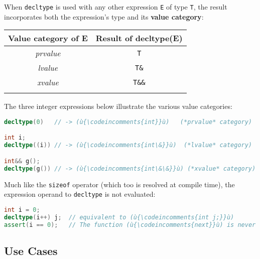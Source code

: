 When \texttt{decltype} is used with any other expression \texttt{E} of
type \texttt{T}, the result incorporates both the expression's type and
its \textbf{value category}:
\begin{center}
{\small \begin{tabular}{c|c}\thickhline
\rowcolor[gray]{.9}   {\sffamily\bfseries Value category of {\ttfamily\bfseries E}}
& {\sffamily\bfseries Result of {\ttfamily\bfseries decltype(E)}} \\ \hline
{\it prvalue} &\texttt{T} \\ \hline
{\it lvalue} & \texttt{T\&} \\ \hline
{\it xvalue} & \texttt{T\&\&} \\ \thickhline
\end{tabular}
}
\end{center}
\noindent The three integer expressions below illustrate the various value
categories:

\begin{lstlisting}[language=C++]
decltype(0)   // -> (ù{\codeincomments{int}}ù)   (*prvalue* category)

int i;
decltype((i)) // -> (ù{\codeincomments{int\&}}ù)  (*lvalue* category)

int&& g();
decltype(g()) // -> (ù{\codeincomments{int\&\&}}ù) (*xvalue* category)
\end{lstlisting}

\noindent Much like the \texttt{sizeof}
operator (which too is resolved at compile time), the expression operand to \texttt{decltype} is not evaluated:

\begin{lstlisting}[language=C++]
int i = 0;
decltype(i++) j;  // equivalent to (ù{\codeincomments{int j;}}ù)
assert(i == 0);   // The function (ù{\codeincomments{next}}ù) is never invoked.
\end{lstlisting}


\subsection[Use Cases]{Use Cases}\label{use-cases}

